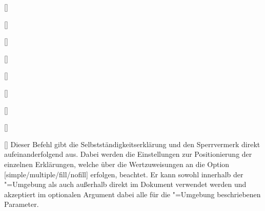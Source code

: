 \begin{Declaration*}{}
\begin{Declaration*}{}
\begin{Declaration*}{}
\begin{Declaration}{\LParameter}
\begin{Declaration}{[]}
\begin{Declaration}[v2.02]{%
  []%
}
\begin{Declaration}[v2.02]{%
  []%
}
\begin{Declaration}[v2.02]{[]}
\begin{Declaration}{[\PSet]}
\begin{Declaration}{[]}
\begin{Declaration}{[]}
\begin{Declaration}{[]}
\begin{Declaration}{[]}
\printdeclarationlist%
%
Dieser Befehl gibt die Selbstständigkeitserklärung und den Sperrvermerk direkt 
aufeinanderfolgend aus. Dabei werden die Einstellungen zur Positionierung der 
einzelnen Erklärungen, welche über die Wertzuweisungen an die Option 
[simple/multiple/fill/nofill] erfolgen, beachtet. Er kann 
sowohl innerhalb der "=Umgebung als auch außerhalb 
direkt im Dokument verwendet werden und akzeptiert im optionalen Argument dabei 
alle für die "=Umgebung beschriebenen Parameter.
\end{Declaration}
\end{Declaration}
\end{Declaration}
\end{Declaration}
\end{Declaration}
\end{Declaration}
\end{Declaration}
\end{Declaration}
\end{Declaration}
\end{Declaration}


\end{Declaration*}
\end{Declaration*}
\end{Declaration*}
